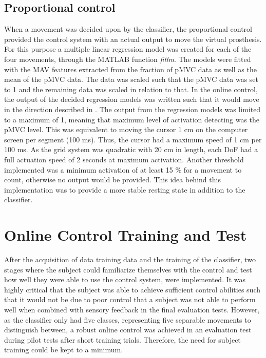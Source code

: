 \subsection{Proportional control}  
When a movement was decided upon by the classifier, the proportional control provided the control system with an actual output to move the virtual prosthesis. For this purpose a multiple linear regression model was created for each of the four movements, through the MATLAB function \textit{fitlm}. The models were fitted with the MAV features extracted from the fraction of pMVC data as well as the mean of the pMVC data. The data was scaled such that the pMVC data was set to 1 and the remaining data was scaled in relation to that. In the online control, the output of the decided regression models was written such that it would move in the direction described in . The output from the regression models was limited to a maximum of 1, meaning that maximum level of activation detecting was the pMVC level. This was equivalent to moving the cursor 1 cm on the computer screen per segment (100 ms). Thus, the cursor had a maximum speed of 1 cm per 100 ms. As the grid system was quadratic with 20 cm in length, each DoF had a full actuation speed of 2 seconds at maximum activation. Another threshold implemented was a minimum activation of at least 15 $\percent$ for a movement to count, otherwise no output would be provided. This idea behind this implementation was to provide a more stable resting state in addition to the classifier. 


\section{Online Control Training and Test} \label{sec:meth:contraintest}

After the acquisition of data training data and the training of the classifier, two stages where the subject could familiarize themselves with the control and test how well they were able to use the control system, were implemented. It was highly critical that the subject was able to achieve sufficient control abilities such that it would not be due to poor control that a subject was not able to perform well when combined with sensory feedback in the final evaluation tests. However, as the classifier only had five classes, representing five separable movements to distinguish between, a robust online control was achieved in an evaluation test during pilot tests after short training trials. Therefore, the need for subject training could be kept to a minimum.  

